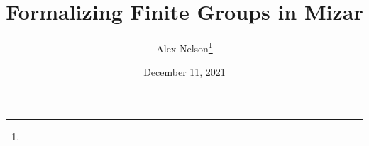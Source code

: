 \documentclass{amsbook}
\begin{document}
\title{Formalizing Finite Groups in Mizar}
\author{Alex Nelson\thanks{\compiledTimestamp}}
\date{December 11, 2021}

\frontmatter
\maketitle\setcounter{page}{2}
\tableofcontents


\mainmatter




\backmatter
\nocite{*}



\clearpage
{}
\printindex
\end{document}
